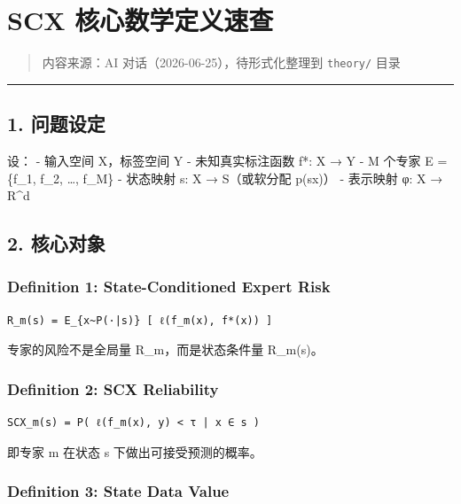 \documentclass[
  12pt,
]{ctexart}
\author{SCX}
\date{2026}
\begin{document}
\section{SCX
核心数学定义速查}\label{scx-ux6838ux5fc3ux6570ux5b66ux5b9aux4e49ux901fux67e5}

\begin{quote}
内容来源：AI 对话（2026-06-25），待形式化整理到 \texttt{theory/} 目录
\end{quote}

\begin{center}\rule{0.5\linewidth}{0.5pt}\end{center}

\subsection{1. 问题设定}\label{ux95eeux9898ux8bbeux5b9a}

设： - 输入空间 X，标签空间 Y - 未知真实标注函数 f*: X → Y - M 个专家 E
= \{f\_1, f\_2, \ldots, f\_M\} - 状态映射 s: X → S（或软分配
p(s\textbar x)） - 表示映射 φ: X → R\^{}d

\subsection{2. 核心对象}\label{ux6838ux5fc3ux5bf9ux8c61}

\subsubsection{Definition 1: State-Conditioned Expert
Risk}\label{definition-1-state-conditioned-expert-risk}

\begin{verbatim}
R_m(s) = E_{x~P(·|s)} [ ℓ(f_m(x), f*(x)) ]
\end{verbatim}

专家的风险不是全局量 R\_m，而是状态条件量 R\_m(s)。

\subsubsection{Definition 2: SCX
Reliability}\label{definition-2-scx-reliability}

\begin{verbatim}
SCX_m(s) = P( ℓ(f_m(x), y) < τ | x ∈ s )
\end{verbatim}

即专家 m 在状态 s 下做出可接受预测的概率。

\subsubsection{Definition 3: State Data
Value}\label{definition-3-state-data-value}
\end{document}
